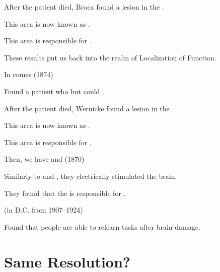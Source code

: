 \begin{coloredlist}
\begin{coloredlist}
        \item After the patient died, Broca found a lesion in the .
        \item This area is now known as .
        \item This area is responsible for .
        \item These results put us back into the realm of Localization of Function.
    \end{coloredlist}
    \item In comes  (1874)
    \begin{coloredlist}
        \item Found a patient who  but could .
        \item After the patient died, Wernicke found a lesion in the .
        \item This area is now known as .
        \item This area is responsible for .
    \end{coloredlist}
    \item Then, we have  and  (1870)
    \begin{coloredlist}
        \item Similarly to  and , they electrically stimulated the brain.
        \item They found that the  is responsible for .
    \end{coloredlist}
    \item {} (in D.C. from 1907--1924)
    \begin{coloredlist}
        \item Found that people are able to relearn tasks after brain damage.
    \end{coloredlist}
\end{coloredlist}

\section{Same Resolution?}

